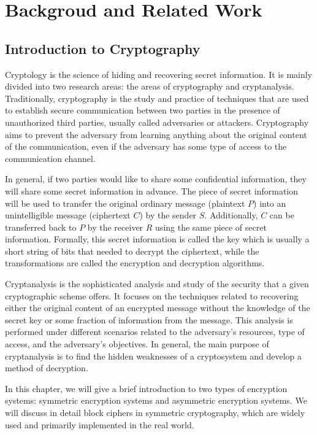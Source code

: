 \part{Backgroud and Related Work} \label{part:Background}
\chapter{Introduction to Cryptography} \label{ch:ItC}
Cryptology is the science of hiding and recovering secret information. It is mainly divided into two research areas: the areas of cryptography and cryptanalysis. Traditionally, cryptography is the study and practice of techniques that are used to establish secure communication between two parties in the presence of unauthorized third parties, usually called adversaries or attackers. Cryptography aims to prevent the adversary from learning anything about the original content of the communication, even if the adversary has some type of access to the communication channel. 

In general, if two parties would like to share some confidential information, they will share some secret information in advance. The piece of secret information will be used to transfer the original ordinary message (plaintext $P$) into an unintelligible message (ciphertext $C$) by the sender $S$. Additionally, $C$ can be transferred back to $P$ by the receiver $R$ using the same piece of secret information.  Formally, this secret information is called the key which is usually a short string of bits that needed to decrypt the ciphertext, while the transformations are called the encryption and decryption algorithms. 

Cryptanalysis is the sophisticated analysis and study of the security that a given cryptographic scheme offers. It focuses on the techniques related to recovering either the original content of an encrypted message without the knowledge of the secret key or some fraction of information from the message. This analysis is performed under different scenarios related to the adversary's resources, type of access, and the adversary's objectives. In general, the main purpose of cryptanalysis is to find the hidden weaknesses of a cryptosystem and develop a method of decryption.

In this chapter, we will give a brief introduction to two types of encryption systems: symmetric encryption systems and asymmetric encryption systems. We will discuss in detail block ciphers in symmetric cryptography, which are widely used and primarily implemented in the real world. 

